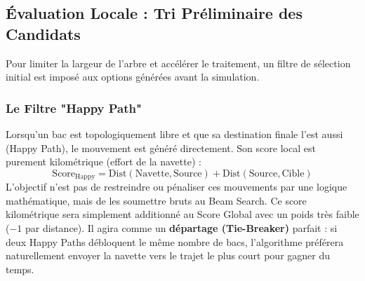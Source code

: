 \documentclass[11pt,a4paper]{article}
\begin{document}
\subsection{Évaluation Locale : Tri Préliminaire des Candidats}

Pour limiter la largeur de l'arbre et accélérer le traitement, un filtre de sélection initial est imposé aux options générées avant la simulation.

\subsubsection{Le Filtre "Happy Path"}
Lorsqu'un bac est topologiquement libre et que sa destination finale l'est aussi (Happy Path), le mouvement est généré directement. Son score local est purement kilométrique (effort de la navette) :
\begin{equation*}
    \text{Score}_{\text{Happy}} = \text{Dist}(\text{Navette}, \text{Source}) + \text{Dist}(\text{Source}, \text{Cible})
\end{equation*}
L'objectif n'est pas de restreindre ou pénaliser ces mouvements par une logique mathématique, mais de les soumettre bruts au Beam Search. Ce score kilométrique sera simplement additionné au Score Global avec un poids très faible ($-1$ par distance). Il agira comme un \textbf{départage (Tie-Breaker)} parfait : si deux Happy Paths débloquent le même nombre de bacs, l'algorithme préférera naturellement envoyer la navette vers le trajet le plus court pour gagner du temps.
\end{document}
